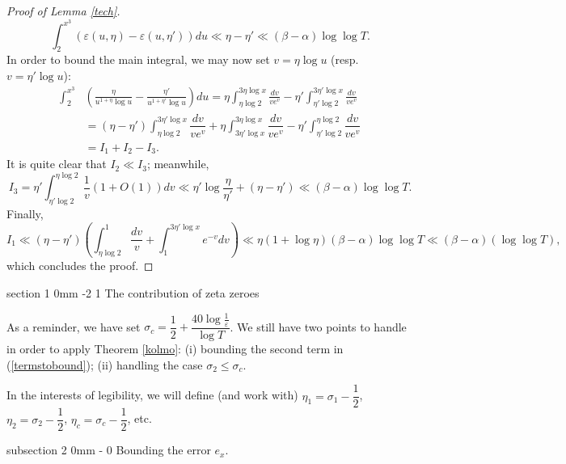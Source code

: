 \documentclass{article}
\makeatletter
\newcommand{\1}{\mathds{1}}
\numberwithin{equation}{section}
\newcommand{\eps}{\varepsilon}
\renewcommand{\leq}{\leqslant}
\theoremstyle{plain} %
\renewcommand{\subsection}{\@startsection
{subsection}%
{2}%
{0mm}%
{-\baselineskip}%
{0 \baselineskip}%
{\normalfont\bf\itshape}} %
\newcommand{\Hf}{\dfrac{1}{2}}
\renewcommand{\section}{\@startsection
{section}%
{1}%
{0mm}%
{-2\baselineskip}%
{1\baselineskip}%
{\normalfont\large\scshape\centering}} %
\makeatother
\begin{document}
\begin{proof}[Proof of Lemma \ref{tech}]
\begin{equation}
    \int_2^{x^3} (\eps(u, \eta) - \eps(u, \eta'))du \ll \eta - \eta' \ll (\beta - \alpha) \log \log T.
\end{equation}
In order to bound the main integral, we may now set $v = \eta \log u$ (resp. $v = \eta' \log u$):
\begin{equation}
    \begin{split}
        \int_2^{x^3} & \left(\frac{\eta}{u^{1 + \eta} \log u} - \frac{\eta'}{u^{1 + \eta'}\log u} \right) du  = \eta \int_{\eta \log 2}^{3 \eta \log x} \frac{dv}{v e^v} - \eta' \int_{\eta' \log 2}^{3\eta' \log x} \frac{dv}{v e^v} \\
        & = (\eta - \eta') \int_{\eta \log 2}^{3 \eta' \log x} \dfrac{dv}{v e^v} + \eta \int_{3 \eta' \log x}^{3 \eta \log x}\dfrac{dv}{v e^v} - \eta' \int_{\eta' \log 2}^{\eta \log 2} \dfrac{dv}{v e^v} \\
        & = I_1 + I_2 - I_3.
    \end{split}
\end{equation}
It is quite clear that $I_2 \ll I_3$; meanwhile,
\begin{equation}
    I_3 = \eta' \int_{\eta' \log 2}^{\eta \log 2} \frac{1}{v}(1 + O(1))dv \ll \eta' \log \frac{\eta}{\eta'} + (\eta - \eta') \ll (\beta - \alpha) \log \log T.
\end{equation}
Finally,
\begin{equation}
        I_1  \ll (\eta - \eta') \left( \int_{\eta \log 2}^1 \dfrac{dv}{v} + \int_{1}^{3 \eta' \log x} e^{-v} dv \right) 
\ll \eta (1 + \log \eta)(\beta - \alpha) \log \log T \ll (\beta - \alpha)(\log \log T),
\end{equation}
which concludes the proof.
\end{proof}

\section{The contribution of zeta zeroes}

As a reminder, we have set $\sigma_c = \Hf + \dfrac{40 \log \frac{1}{\eps}}{\log T}$. We still have two points to handle in order to apply Theorem \ref{kolmo}:
(i) bounding the second term in (\ref{termstobound});
(ii) handling the case $\sigma_2 \leq \sigma_c$.

In the interests of legibility, we will define (and work with) $\eta_1 = \sigma_1 - \Hf$, $\eta_2 = \sigma_2 - \Hf$, $\eta_c = \sigma_c - \Hf$, etc.

\subsection{Bounding the error $e_x$. }
\end{document}
